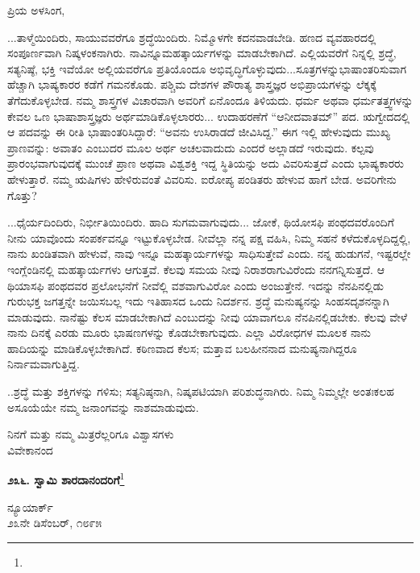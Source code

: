 \noindent
ಪ್ರಿಯ ಅಳಸಿಂಗ,

...ತಾಳ್ಮೆಯಿಂದಿರು, ಸಾಯುವವರೆಗೂ ಶ್ರದ್ಧೆಯಿಂದಿರು. ನಿಮ್ಮೊಳಗೇ ಕದನವಾಡಬೇಡಿ. ಹಣದ ವ್ಯವಹಾರದಲ್ಲಿ ಸಂಪೂರ್ಣವಾಗಿ ನಿಷ್ಕಳಂಕನಾಗಿರು. ನಾವಿನ್ನೂ\break ಮಹತ್ಕಾರ್ಯಗಳನ್ನು ಮಾಡಬೇಕಾಗಿದೆ. ಎಲ್ಲಿಯವರೆಗೆ ನಿನ್ನಲ್ಲಿ ಶ್ರದ್ಧೆ, ಸತ್ಯನಿಷ್ಠೆ, ಭಕ್ತಿ ಇವೆಯೋ ಅಲ್ಲಿಯವರೆಗೂ ಪ್ರತಿಯೊಂದೂ ಅಭಿವೃದ್ಧಿಗೊಳ್ಳುವುದು...ಸೂತ್ರಗಳನ್ನು\break ಭಾಷಾಂತರಿಸುವಾಗ ಹೆಚ್ಚಾಗಿ ಭಾಷ್ಯಕಾರರ ಕಡೆಗೆ ಗಮನಕೊಡು. ಪಶ್ಚಿಮ ದೇಶಗಳ ಪೌರಾತ್ಯ ಶಾಸ್ತ್ರಜ್ಞರ ಅಭಿಪ್ರಾಯಗಳನ್ನು ಲೆಕ್ಕಕ್ಕೆ ತೆಗೆದುಕೊಳ್ಳಬೇಡ. ನಮ್ಮ ಶಾಸ್ತ್ರಗಳ ವಿಚಾರವಾಗಿ ಅವರಿಗೆ ಏನೊಂದೂ ತಿಳಿಯದು. ಧರ್ಮ ಅಥವಾ ಧರ್ಮತತ್ತ್ವಗಳನ್ನು ಕೇವಲ ಒಣ ಭಾಷಾಶಾಸ್ತ್ರಜ್ಞರು ಅರ್ಥಮಾಡಿಕೊಳ್ಳಲಾರರು... ಉದಾಹರಣೆಗೆ “ಆನೀದವಾತಮ್” ಪದ. ಋಗ್ವೇದದಲ್ಲಿ ಆ ಪದವನ್ನು ಈ ರೀತಿ ಭಾಷಾಂತರಿಸಿದ್ದಾರೆ: “ಅವನು ಉಸಿರಾಡದೆ ಜೀವಿಸಿದ್ದ.” ಈಗ ಇಲ್ಲಿ ಹೇಳುವುದು ಮುಖ್ಯ ಪ್ರಾಣವನ್ನು: ಅವಾತಂ ಎಂಬುದರ ಮೂಲ ಅರ್ಥ ಅಚಲವಾದುದು ಎಂದರೆ ಅಲ್ಲಾಡದೆ ಇರುವುದು. ಕಲ್ಪವು ಪ್ರಾರಂಭವಾಗುವುದಕ್ಕೆ ಮುಂಚೆ ಪ್ರಾಣ ಅಥವಾ ವಿಶ್ವಶಕ್ತಿ ಇದ್ದ ಸ್ಥಿತಿಯನ್ನು ಅದು ವಿವರಿಸುತ್ತದೆ ಎಂದು ಭಾಷ್ಯಕಾರರು ಹೇಳುತ್ತಾರೆ. ನಮ್ಮ ಋಷಿಗಳು ಹೇಳಿರುವಂತೆ ವಿವರಿಸು. ಐರೋಪ್ಯ ಪಂಡಿತರು ಹೇಳುವ ಹಾಗೆ ಬೇಡ. ಅವರಿಗೇನು ಗೊತ್ತು?

...ಧೈರ್ಯದಿಂದಿರು, ನಿರ್ಭೀತಿಯಿಂದಿರು. ಹಾದಿ ಸುಗಮವಾಗುವುದು... ಜೋಕೆ, ಥಿಯೋಸಫಿ ಪಂಥದವರೊಂದಿಗೆ ನೀನು ಯಾವೊಂದು ಸಂಪರ್ಕವನ್ನೂ ಇಟ್ಟುಕೊಳ್ಳಬೇಡ. ನೀವೆಲ್ಲಾ ನನ್ನ ಪಕ್ಷ ವಹಿಸಿ, ನಿಮ್ಮ ಸಹನೆ ಕಳೆದುಕೊಳ್ಳದಿದ್ದಲ್ಲಿ, ನಾನು ಖಂಡಿತವಾಗಿ ಹೇಳುವೆ, ನಾವು ಇನ್ನೂ ಮಹತ್ಕಾರ್ಯಗಳನ್ನು ಸಾಧಿಸುತ್ತೇವೆ ಎಂದು. ನನ್ನ ಹುಡುಗನೆ, ಇಷ್ಟರಲ್ಲೇ ಇಂಗ್ಲೆಂಡಿನಲ್ಲಿ ಮಹತ್ಕಾರ್ಯಗಳು ಆಗುತ್ತವೆ. ಕೆಲವು ಸಮಯ ನೀವು ನಿರಾಶರಾಗುವಿರೆಂದು ನನಗನ್ನಿಸುತ್ತದೆ. ಆ ಥಿಯಾಸಫಿ ಪಂಥದವರ ಪ್ರಲೋಭನೆಗೆ ನೀವೆಲ್ಲಿ ವಶವಾಗುವಿರೋ ಎಂದು ಅಂಜುತ್ತೇನೆ. ಇದನ್ನು ನೆನಪಿನಲ್ಲಿಡು ಗುರುಭಕ್ತ ಜಗತ್ತನ್ನೇ ಜಯಿಸಬಲ್ಲ\enginline{-} ಇದು ಇತಿಹಾಸದ ಒಂದು ನಿದರ್ಶನ. ಶ್ರದ್ಧೆ ಮನುಷ್ಯನನ್ನು ಸಿಂಹಸದೃಶನನ್ನಾಗಿ ಮಾಡುವುದು. ನಾನೆಷ್ಟು ಕೆಲಸ ಮಾಡಬೇಕಾಗಿದೆ ಎಂಬುದನ್ನು ನೀವು ಯಾವಾಗಲೂ ನೆನಪಿನಲ್ಲಿಡಬೇಕು. ಕೆಲವು ವೇಳೆ ನಾನು ದಿನಕ್ಕೆ ಎರಡು ಮೂರು ಭಾಷಣಗಳನ್ನು ಕೊಡಬೇಕಾಗುವುದು. ಎಲ್ಲಾ ವಿರೋಧಗಳ ಮೂಲಕ ನಾನು ಹಾದಿಯನ್ನು ಮಾಡಿಕೊಳ್ಳಬೇಕಾಗಿದೆ. ಕಠಿಣವಾದ ಕೆಲಸ; ಮತ್ತಾವ ಬಲಹೀನನಾದ ಮನುಷ್ಯನಾಗಿದ್ದರೂ ನಿರ್ನಾಮವಾಗುತ್ತಿದ್ದ.

..ಶ್ರದ್ಧೆ ಮತ್ತು ಶಕ್ತಿಗಳನ್ನು ಗಳಿಸು; ಸತ್ಯನಿಷ್ಠನಾಗಿ, ನಿಷ್ಕಪಟಿಯಾಗಿ ಪರಿಶುದ್ಧನಾಗಿರು. ನಿಮ್ಮ ನಿಮ್ಮಲ್ಲೇ ಅಂತಃಕಲಹ ಅಸೂಯೆಯೇ ನಮ್ಮ ಜನಾಂಗವನ್ನು ನಾಶಮಾಡುವುದು.

{\flushright
ನಿನಗೆ ಮತ್ತು ನಮ್ಮ ಮಿತ್ರರೆಲ್ಲರಿಗೂ ವಿಶ್ವಾಸಗಳು\\ವಿವೇಕಾನಂದ\par}

\begin{center}
\textbf{೨೩೬. ಸ್ವಾಮಿ ಶಾರದಾನಂದರಿಗೆ}\footnote{}
\end{center}

\vspace{-0.5cm}

\begin{flushright}
ನ್ಯೂಯಾರ್ಕ್\\೨೩ನೇ ಡಿಸೆಂಬರ್, ೧೮೯೫
\end{flushright}

